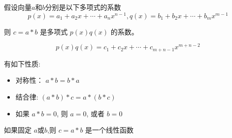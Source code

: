 \begin{corollary}
    假设向量$a$和$b$分别是以下多项式的系数
    \begin{equation} p(x)=a_{1}+a_{2} x+\cdots+a_{n} x^{n-1}, q(x)=b_{1}+b_{2} x+\cdots+b_{m} x^{m-1} \end{equation}

    则 $ {c}={a}{*} {b} $ 是多项式 $ p(x) q(x) $ 的系数。

    \begin{equation} p(x) q(x)=c_{1}+c_{2} x+\cdots+c_{m+n-1} x^{m+n-2} \end{equation}
\end{corollary}

\begin{corollary}[卷积性质]
    有如下性质:
    \begin{itemize}
        \item 对称性： $ a * b=b * a $
        \item 结合律: $ (a * b) * c=a *(b * c) $
        \item 如果 $ a * b=0 $, 则 $ a=0 $, 或者 $ b=0 $
    \end{itemize}
\end{corollary}

\begin{corollary}
    如果固定 $ a $或$b$,则 $ c=a * b $ 是一个线性函数
\end{corollary}

